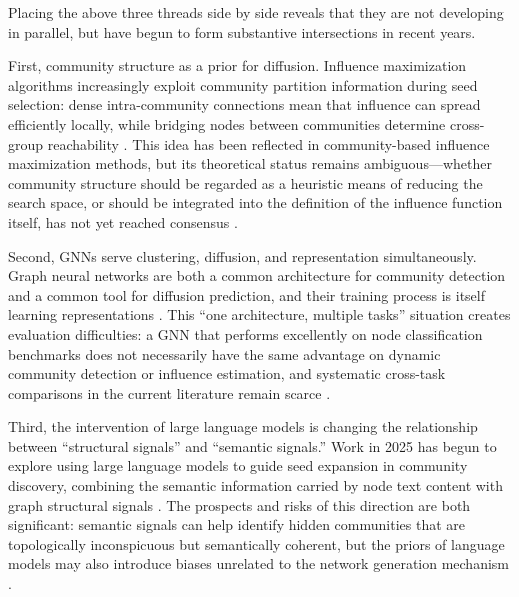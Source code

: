 \documentclass[12pt,a4paper]{article}
\begin{document}
Placing the above three threads side by side reveals that they are not developing in parallel, but have begun to form substantive intersections in recent years.

First, community structure as a prior for diffusion. Influence maximization algorithms increasingly exploit community partition information during seed selection: dense intra-community connections mean that influence can spread efficiently locally, while bridging nodes between communities determine cross-group reachability \cite{ref7,ref8}. This idea has been reflected in community-based influence maximization methods, but its theoretical status remains ambiguous---whether community structure should be regarded as a heuristic means of reducing the search space, or should be integrated into the definition of the influence function itself, has not yet reached consensus \cite{ref7}.

Second, GNNs serve clustering, diffusion, and representation simultaneously. Graph neural networks are both a common architecture for community detection and a common tool for diffusion prediction, and their training process is itself learning representations \cite{ref4}. This ``one architecture, multiple tasks'' situation creates evaluation difficulties: a GNN that performs excellently on node classification benchmarks does not necessarily have the same advantage on dynamic community detection or influence estimation, and systematic cross-task comparisons in the current literature remain scarce \cite{ref13}.

Third, the intervention of large language models is changing the relationship between ``structural signals'' and ``semantic signals.'' Work in 2025 has begun to explore using large language models to guide seed expansion in community discovery, combining the semantic information carried by node text content with graph structural signals \cite{ref13}. The prospects and risks of this direction are both significant: semantic signals can help identify hidden communities that are topologically inconspicuous but semantically coherent, but the priors of language models may also introduce biases unrelated to the network generation mechanism \cite{ref13}.
\end{document}
